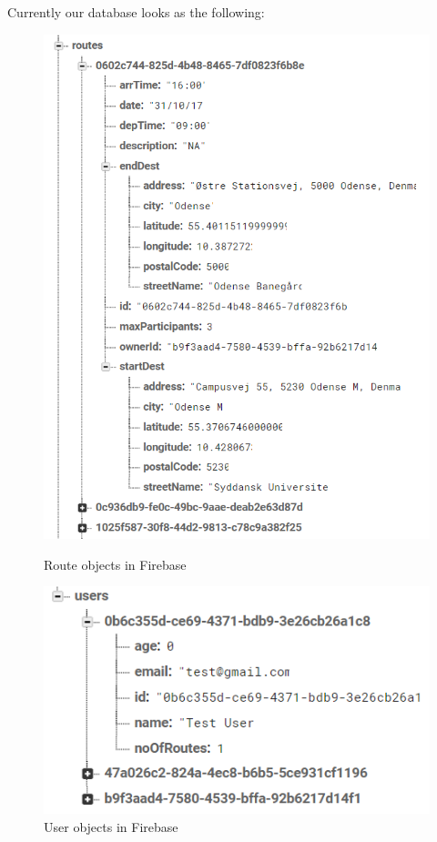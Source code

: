 Currently our database looks as the following:
\begin{figure}[!htb]
    \centering
    \begin{minipage}{.5\textwidth}
        \centering
        \includegraphics[scale=0.8]{Graphics/Images/firebase_routes.PNG}
        \caption{Route objects in Firebase}
        \label{fig:firebase_routes}
    \end{minipage}%
    \begin{minipage}{0.5\textwidth}
        \centering
        \includegraphics[scale=0.8]{Graphics/Images/firebase_users.PNG}
        \caption{User objects in Firebase}
        \label{fig:firebase_users}
    \end{minipage}
\end{figure}

